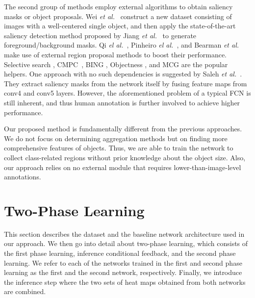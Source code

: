 \documentclass[10pt,twocolumn,letterpaper]{article}
\begin{document}
The second group of methods employ external algorithms to obtain saliency masks or object proposals. Wei \textit{et al.}~\cite{Wei15stc} construct a new dataset consisting of images with a well-centered single object, and then apply the state-of-the-art saliency detection method proposed by Jiang \textit{et al.}~\cite{JiangWYWZL13drfi} to generate foreground/background masks. Qi \textit{el al.}~\cite{QiLSZJ16aug}, Pinheiro \textit{el al.}~\cite{Pinheiro2015CVPR}, and Bearman \textit{et al.}~\cite{BearmanRFL16wtp} make use of external region proposal methods to boost their performance. Selective search \cite{UijlingsSGS13ss}, CMPC~\cite{carreira2012pami}, BING \cite{ChengZLT14bing}, Objectness \cite{AlexeDF12obj}, and MCG \cite{ArbelaezPBMM14mcg} are the popular helpers. One approach with no such dependencies is suggested by  Saleh \textit{et al.}~\cite{SalehASPGA16builtin}. They extract saliency masks from the network itself by fusing feature maps from conv4 and conv5 layers. However, the aforementioned problem of a typical FCN is still inherent, and thus human annotation is further involved to achieve higher performance.

Our proposed method is fundamentally different from the previous approaches. We do not focus on determining aggregation methods but on finding more comprehensive features of objects. Thus, we are able to train the network to collect class-related regions without prior knowledge about the object size. Also, our approach relies on no external module that requires lower-than-image-level annotations.  



\section{Two-Phase Learning}
\label{sec:two_phase_learning}
This section describes the dataset and the baseline network architecture used in our approach. We then go into detail about two-phase learning, which consists of the first phase learning, inference conditional feedback, and the second phase learning. %
We refer to each of the networks trained in the first and second phase learning as the first and the second network, respectively. Finally, we introduce the inference step where the two sets of heat maps obtained from both networks are combined.
\end{document}
